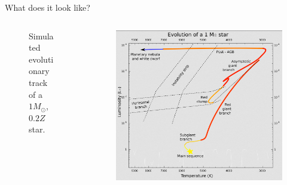 \documentclass{beamer}
\begin{document}
\begin{frame}{What does it look like?}
    \begin{columns}
        \begin{column}{0.5\textwidth}
            \begin{center}
                \begin{figure}
                    \caption{Simulated evolutionary track of a $1 M_\odot$, $0.2Z$ star.}
                    \label{fig:hr_1M_02Z}
                    \end{figure}
            \end{center}
        \end{column}
        \begin{column}{0.5\textwidth}
            \begin{center}
                \begin{figure}
                    \includegraphics[width=\textwidth]{figs/hr_example_1m}

\end{figure}
\end{center}
\end{column}
\end{columns}
\end{frame}
\end{document}
